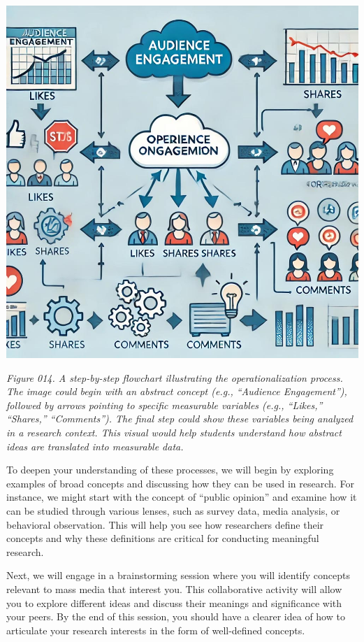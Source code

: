 \documentclass[
]{book}
\begin{document}
\includegraphics[width=1\textwidth,height=\textheight]{images/fig014.jpg}

\emph{Figure 014. A step-by-step flowchart illustrating the operationalization process. The image could begin with an abstract concept (e.g., ``Audience Engagement''), followed by arrows pointing to specific measurable variables (e.g., ``Likes,'' ``Shares,'' ``Comments''). The final step could show these variables being analyzed in a research context. This visual would help students understand how abstract ideas are translated into measurable data.}

To deepen your understanding of these processes, we will begin by exploring examples of broad concepts and discussing how they can be used in research. For instance, we might start with the concept of ``public opinion'' and examine how it can be studied through various lenses, such as survey data, media analysis, or behavioral observation. This will help you see how researchers define their concepts and why these definitions are critical for conducting meaningful research.

Next, we will engage in a brainstorming session where you will identify concepts relevant to mass media that interest you. This collaborative activity will allow you to explore different ideas and discuss their meanings and significance with your peers. By the end of this session, you should have a clearer idea of how to articulate your research interests in the form of well-defined concepts.
\end{document}
